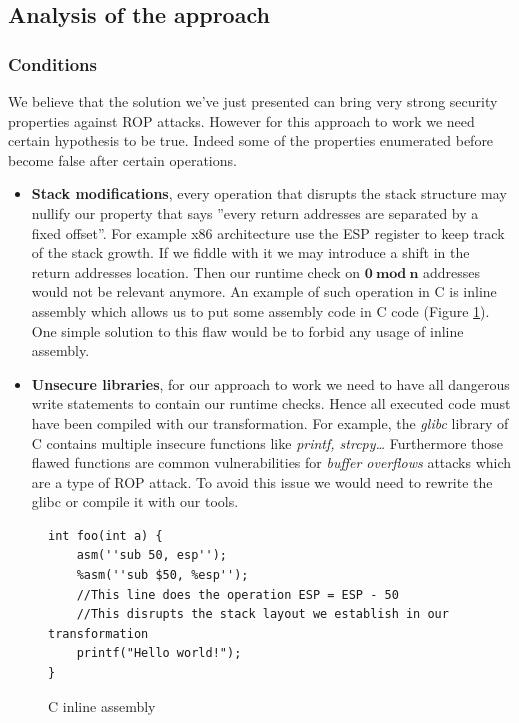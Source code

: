 \documentclass[11pt]{sdm}
\begin{document}
\subsection{Analysis of the approach}
\label{sub:Analysis of the approach}


\subsubsection{Conditions}
\label{ssub:Conditions}

We believe that the solution we've just presented can bring very strong security properties against ROP attacks. However for this approach to work we need certain hypothesis to be true. Indeed some of the properties enumerated before become false after certain operations.

\begin{itemize}
	\item \textbf{Stack modifications}, every operation that disrupts the stack structure may nullify our property that says ''every return addresses are separated by a fixed offset''. For example x86 architecture use the ESP register to keep track of the stack growth. If we fiddle with it we may introduce a shift in the return addresses location. Then our runtime check on $\mathbf{0~mod~n}$ addresses would not be relevant anymore.
		An example of such operation in C is inline assembly which allows us to put some assembly code in C code (Figure \ref{inline_assembly}). One simple solution to this flaw would be to forbid any usage of inline assembly.

	\item \textbf{Unsecure libraries}, for our approach to work we need to have all dangerous write statements to contain our runtime checks. Hence all executed code must have been compiled with our transformation. For example, the \textit{glibc} library of C contains multiple insecure functions like \textit{printf, strcpy\dots} Furthermore those flawed functions are common vulnerabilities for \textit{buffer overflows} attacks which are a type of ROP attack. To avoid this issue we would need to rewrite the glibc or compile it with our tools.
\end{itemize}

\begin{figure}
\begin{lstlisting}
int foo(int a) {
	asm(''sub 50, esp'');
	%asm(''sub $50, %esp'');
	//This line does the operation ESP = ESP - 50
	//This disrupts the stack layout we establish in our transformation
	printf("Hello world!");
}
\end{lstlisting}
\centering
\caption{C inline assembly}
\label{inline_assembly}
\end{figure}
\end{document}
